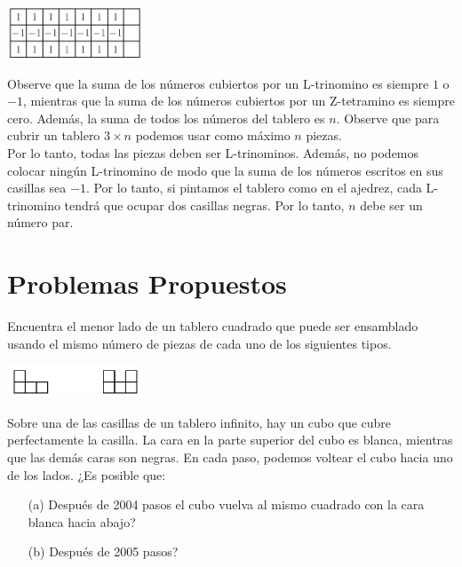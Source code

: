 \documentclass[11pt]{scrartcl}
\begin{document}
\begin{center}
    \includegraphics[width=4cm]{images/clase_combi_centro_09_problema_5_solucion.png}
\end{center}

Observe que la suma de los números cubiertos por un L-trinomino es siempre $1$ o $-1$, mientras que la suma de los números cubiertos por un Z-tetramino es siempre cero. Además, la suma de todos los números del tablero es \(n\). Observe que para cubrir un tablero $3 \times n$ podemos usar como máximo \(n\) piezas.\\

Por lo tanto, todas las piezas deben ser L-trinominos. Además, no podemos colocar ningún L-trinomino de modo que la suma de los números escritos en sus casillas sea $-1$. Por lo tanto, si pintamos el tablero como en el ajedrez, cada L-trinomino tendrá que ocupar dos casillas negras. Por lo tanto, \(n\) debe ser un número par.


\section{Problemas Propuestos}

\begin{problem}
Encuentra el menor lado de un tablero cuadrado que puede ser ensamblado usando el mismo número de piezas de cada uno de los siguientes tipos.
\begin{center}
    \includegraphics[width=4cm]{images/clase_09_L_y_U_tetramino.png}
\end{center}
\end{problem}

\begin{problem}
Sobre una de las casillas de un tablero infinito, hay un cubo que cubre perfectamente la casilla. La cara en la parte superior del cubo es blanca, mientras que las demás caras son negras. En cada paso, podemos voltear el cubo hacia uno de los lados. ¿Es posible que:\begin{itemize}
\item[(a)] Después de 2004 pasos el cubo vuelva al mismo cuadrado con la cara blanca hacia abajo?
\item[(b)] Después de 2005 pasos?
\end{itemize}
\end{problem}
\end{document}
